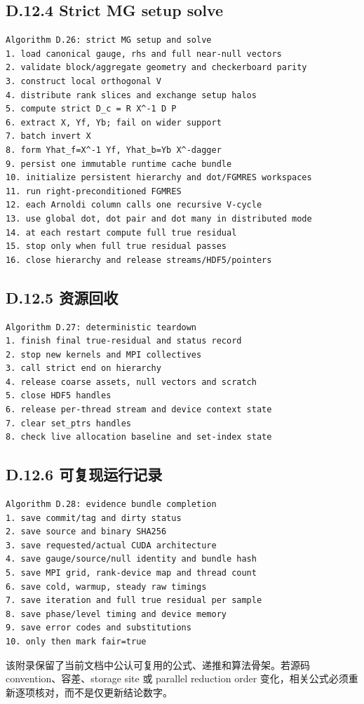 \documentclass[UTF8,a4paper,10pt]{ctexart}
\begin{document}
\subsection{D.12.4 Strict MG setup solve}
\begin{Verbatim}[breaklines=true,breakanywhere=true,fontsize=\scriptsize]
Algorithm D.26: strict MG setup and solve
1. load canonical gauge, rhs and full near-null vectors
2. validate block/aggregate geometry and checkerboard parity
3. construct local orthogonal V
4. distribute rank slices and exchange setup halos
5. compute strict D_c = R X^-1 D P
6. extract X, Yf, Yb; fail on wider support
7. batch invert X
8. form Yhat_f=X^-1 Yf, Yhat_b=Yb X^-dagger
9. persist one immutable runtime cache bundle
10. initialize persistent hierarchy and dot/FGMRES workspaces
11. run right-preconditioned FGMRES
12. each Arnoldi column calls one recursive V-cycle
13. use global dot, dot pair and dot many in distributed mode
14. at each restart compute full true residual
15. stop only when full true residual passes
16. close hierarchy and release streams/HDF5/pointers
\end{Verbatim}
\subsection{D.12.5 资源回收}
\begin{Verbatim}[breaklines=true,breakanywhere=true,fontsize=\scriptsize]
Algorithm D.27: deterministic teardown
1. finish final true-residual and status record
2. stop new kernels and MPI collectives
3. call strict end on hierarchy
4. release coarse assets, null vectors and scratch
5. close HDF5 handles
6. release per-thread stream and device context state
7. clear set_ptrs handles
8. check live allocation baseline and set-index state
\end{Verbatim}
\subsection{D.12.6 可复现运行记录}
\begin{Verbatim}[breaklines=true,breakanywhere=true,fontsize=\scriptsize]
Algorithm D.28: evidence bundle completion
1. save commit/tag and dirty status
2. save source and binary SHA256
3. save requested/actual CUDA architecture
4. save gauge/source/null identity and bundle hash
5. save MPI grid, rank-device map and thread count
6. save cold, warmup, steady raw timings
7. save iteration and full true residual per sample
8. save phase/level timing and device memory
9. save error codes and substitutions
10. only then mark fair=true
\end{Verbatim}
该附录保留了当前文档中公认可复用的公式、递推和算法骨架。若源码 convention、容差、storage site 或 parallel reduction order 变化，相关公式必须重新逐项核对，而不是仅更新结论数字。
\end{document}
